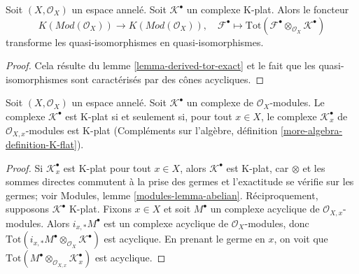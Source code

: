 {\begin{definition}
\end{definition}

\begin{lemma}

\label{lemma-K-flat-quasi-isomorphism}

Soit $(X, \mathcal{O}_X)$ un espace annelé. Soit $\mathcal{K}^\bullet$ un complexe K-plat. Alors le foncteur
$$
K(\textit{Mod}(\mathcal{O}_X))
\longrightarrow
K(\textit{Mod}(\mathcal{O}_X)), \quad
\mathcal{F}^\bullet
\longmapsto
\text{Tot}(\mathcal{F}^\bullet \otimes_{\mathcal{O}_X} \mathcal{K}^\bullet)
$$
transforme les quasi-isomorphismes en quasi-isomorphismes.

\end{lemma}

\begin{proof}

Cela résulte du lemme \ref{lemma-derived-tor-exact}
et le fait que les quasi-isomorphismes sont caractérisés par des cônes acycliques.

\end{proof}

\begin{lemma}

\label{lemma-check-K-flat-stalks}

Soit $(X, \mathcal{O}_X)$ un espace annelé. Soit $\mathcal{K}^\bullet$
un complexe de $\mathcal{O}_X$-modules. Le complexe $\mathcal{K}^\bullet$
est K-plat si et seulement si, pour tout $x \in X$, le complexe
$\mathcal{K}_x^\bullet$ de $\mathcal{O}_{X, x}$-modules est K-plat (Compléments sur l'algèbre, définition \ref{more-algebra-definition-K-flat}).

\end{lemma}

\begin{proof}

Si $\mathcal{K}_x^\bullet$ est K-plat pour tout $x \in X$, alors $\mathcal{K}^\bullet$ est K-plat, car $\otimes$ et les sommes directes commutent à la prise des germes et l'exactitude se vérifie sur les germes; voir Modules, lemme \ref{modules-lemma-abelian}. Réciproquement, supposons $\mathcal{K}^\bullet$ K-plat. Fixons $x \in X$
et soit
$M^\bullet$ un complexe acyclique de $\mathcal{O}_{X, x}$-modules. Alors $i_{x, *}M^\bullet$ est un complexe acyclique de $\mathcal{O}_X$-modules, donc $\text{Tot}(i_{x, *}M^\bullet \otimes_{\mathcal{O}_X} \mathcal{K}^\bullet)$
est acyclique. En prenant le germe en $x$, on voit que
$\text{Tot}(M^\bullet \otimes_{\mathcal{O}_{X, x}} \mathcal{K}_x^\bullet)$
est acyclique.


\end{proof}}
